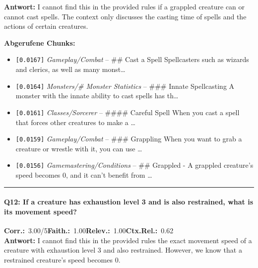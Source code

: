 \noindent\textbf{Antwort:} I cannot find this in the provided rules if a grappled creature can or cannot cast spells. The context only discusses the casting time of spells and the actions of certain creatures.

\noindent\textbf{Abgerufene Chunks:}
\begin{itemize}[noitemsep, topsep=2pt]
  \item[\textbf{\#1}] \texttt{[0.0167]} \textit{Gameplay/Combat} -- \#\# Cast a Spell  Spellcasters such as wizards and clerics, as well as many monst\ldots
  \item[\textbf{\#2}] \texttt{[0.0164]} \textit{Monsters/# Monster Statistics} -- \#\#\# Innate Spellcasting  A monster with the innate ability to cast spells has th\ldots
  \item[\textbf{\#3}] \texttt{[0.0161]} \textit{Classes/Sorcerer} -- \#\#\#\# Careful Spell  When you cast a spell that forces other creatures to make a \ldots
  \item[\textbf{\#4}] \texttt{[0.0159]} \textit{Gameplay/Combat} -- \#\#\# Grappling  When you want to grab a creature or wrestle with it, you can use \ldots
  \item[\textbf{\#5}] \texttt{[0.0156]} \textit{Gamemastering/Conditions} -- \#\# Grappled  - A grappled creature's speed becomes 0, and it can't benefit from \ldots
\end{itemize}
\vspace{4pt}
\hrule
\vspace{6pt}

\paragraph{Q12: If a creature has exhaustion level 3 and is also restrained, what is its movement speed?}
\noindent \textbf{Corr.:}~3.00/5\quad \textbf{Faith.:}~1.00\quad \textbf{Relev.:}~1.00\quad \textbf{Ctx.Rel.:}~0.62\\

\noindent\textbf{Antwort:} I cannot find this in the provided rules the exact movement speed of a creature with exhaustion level 3 and also restrained. However, we know that a restrained creature's speed becomes 0.

